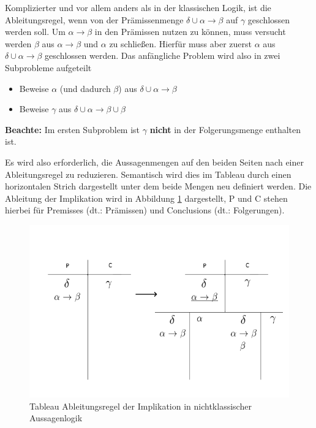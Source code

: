 Komplizierter und vor allem anders als in der klassischen Logik, ist die Ableitungsregel, wenn von der Prämissenmenge $\delta\cup\alpha\rightarrow\beta$ auf $\gamma$ geschlossen werden soll. Um $\alpha\rightarrow\beta$ in den Prämissen nutzen zu können, muss versucht werden $\beta$ aus $\alpha\rightarrow\beta$ und $\alpha$ zu schließen. Hierfür muss aber zuerst $\alpha$ aus $\delta\cup\alpha\rightarrow\beta$ geschlossen werden. Das anfängliche Problem wird also in zwei Subprobleme aufgeteilt \cite{B62}

\begin{itemize}
\item Beweise $\alpha$ (und dadurch $\beta$) aus $\delta\cup\alpha\rightarrow\beta$

\item Beweise $\gamma$ aus $\delta\cup\alpha\rightarrow\beta\cup\beta$
\end{itemize}

\textbf{Beachte:} Im ersten Subproblem ist $\gamma$ \textbf{nicht} in der Folgerungsmenge enthalten ist.

Es wird also erforderlich, die Aussagenmengen auf den beiden Seiten nach einer Ableitungsregel zu reduzieren. Semantisch wird dies im Tableau durch einen horizontalen Strich dargestellt unter dem beide Mengen neu definiert werden. Die Ableitung der Implikation wird in Abbildung \ref{tableaux_impl_ipc} dargestellt, P und C stehen hierbei für Premisses (dt.: Prämissen) und Conclusions (dt.: Folgerungen).

\begin{figure}[h]
\begin{center}
\includegraphics[scale=0.7]{images/Tableaux_Impl_IPC.png}
\caption{Tableau Ableitungsregel der Implikation in nichtklassischer Aussagenlogik}
\label{tableaux_impl_ipc}
\end{center}
\end{figure}

